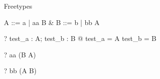 \begin{zsection}
  \SECTION Freetypes
\end{zsection}

\begin{zed}
  A ::= a | aa \ldata B \rdata &
  B ::= b | bb \ldata A \rdata
\end{zed}

\begin{zed}
  \vdash? \exists test\_a : \power A; test\_b : \power B @
     test\_a = A \land
     test\_b = B
\end{zed}
\begin{zed} \vdash? aa \in \power (B \cross A) \end{zed}
\begin{zed} \vdash? bb \in \power (A \cross B) \end{zed}
